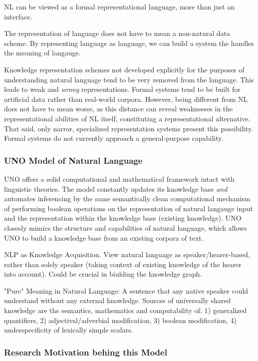 \documentclass[11pt]{article}
\begin{document}
NL can be viewed as a formal representational language, more than just an interface.

The representation of language does not have to mean a non-natural data scheme.  By representing language as language, we can build a system the handles the meaning of langauge.

Knowledge representation schemes not developed explicitly for the purposes of understanding natural language tend to be very removed from the language.  This leads to weak and \emph{wrong} representations.  Formal systems tend to be built for artificial data rather than real-world corpora.  However, being different from NL does not have to mean worse, as this distance can reveal weaknesses in the representational abilities of NL itself, constituting a representational alternative.  That said, only narror, specialized representation systems present this possibility.  Formal systems do not currently approach a general-purpose capability.

\subsubsection{UNO Model of Natural Language}

UNO offers a solid computational and mathematical framework intact with linguistic theories. The model constantly updates its knowledge base \emph{and} automates inferencing by the same semantically clean computational mechanism of performing boolean operations on the representation of natural langauge input and the representation within the knowledge base (existing knowledge).  UNO closesly mimics the structure and capabilities of natural language, which allows UNO to build a knowledge base from an existing corpora of text.

NLP as Knowledge Acquisition. View natural language as speaker/hearer-based, rather than solely speaker (taking context of existing knowledge of the hearer into account). Could be crucial in biulding the knowledge graph.  

"Pure" Meaning in Natural Language: A sentence that any native speaker could understand without any external knowledge.  Sources of universally shared knowledge are the semantics, mathematics and computability of: 1) generalized quantifiers, 2) adjectival/adverbial modification, 3) boolean modification, 4) underspecificity of lexically simple scalars.

\subsubsection{Research Motivation behing this Model}
\end{document}
